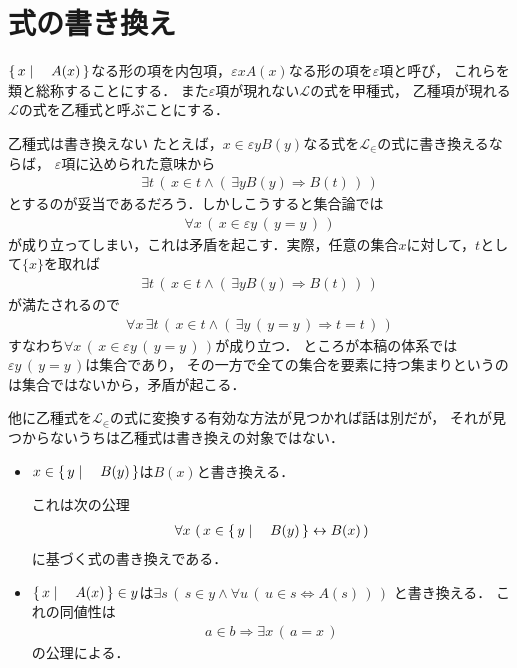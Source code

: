 \section{式の書き換え}
	$\left\{\, x \mid \quad A(x)\, \right\}$なる形の項を内包項，$\varepsilon x A(x)$なる形の項を$\varepsilon$項と呼び，
	これらを類と総称することにする．
	また$\varepsilon$項が現れない$\mathcal{L}$の式を甲種式，
	乙種項が現れる$\mathcal{L}$の式を乙種式と呼ぶことにする．
	
	\begin{itembox}[l]{乙種式は書き換えない}
		たとえば，$x \in \varepsilon y B(y)$なる式を$\mathcal{L}_{\in}$の式に書き換えるならば，
		$\varepsilon$項に込められた意味から
		\begin{align}
			\exists t\, (\, x \in t \wedge 
			(\, \exists y B(y) \Longrightarrow B(t)\, )\, )
		\end{align}
		とするのが妥当であるだろう．しかしこうすると集合論では
		\begin{align}
			\forall x\, (\, x \in \varepsilon y\, (\, y=y\, )\, )
		\end{align}
		が成り立ってしまい，これは矛盾を起こす．実際，任意の集合$x$に対して，$t$として$\{x\}$を取れば
		\begin{align}
			\exists t\, (\, x \in t \wedge 
			(\, \exists y B(y) \Longrightarrow B(t)\, )\, )
		\end{align}
		が満たされるので
		\begin{align}
			\forall x\, \exists t\, (\, x \in t \wedge 
			(\, \exists y\, (\, y = y\, ) \Longrightarrow t = t\, )\, )
		\end{align}
		すなわち$\forall x\, (\, x \in \varepsilon y\, (\, y=y\, )\, )$が成り立つ．
		ところが本稿の体系では$\varepsilon y\, (\, y = y\, )$は集合であり，
		その一方で全ての集合を要素に持つ集まりというのは集合ではないから，矛盾が起こる．
		
		他に乙種式を$\mathcal{L}_{\in}$の式に変換する有効な方法が見つかれば話は別だが，
		それが見つからないうちは乙種式は書き換えの対象ではない．
	\end{itembox}
	
	\begin{itemize}
		\item $x \in \left\{\, y \mid \quad B(y)\, \right\}$は$B(x)$と書き換える．
			
			これは次の公理
			\begin{align}
				\forall x\, \left(\, x \in \left\{\, y \mid \quad B(y)\, \right\} \leftrightarrow B(x)\, \right)
			\end{align}
			に基づく式の書き換えである．
			
		\item $\left\{\, x \mid \quad A(x)\, \right\} \in y$は$\exists s\, \left(\, s \in y \wedge 
			\forall u\, (\, u \in s \Longleftrightarrow A(s)\, )\, \right)$
			と書き換える．
			これの同値性は
			\begin{align}
				a \in b \Longrightarrow \exists x\, (\, a = x\, )
			\end{align}
			の公理による．
			
	\end{itemize}
	
